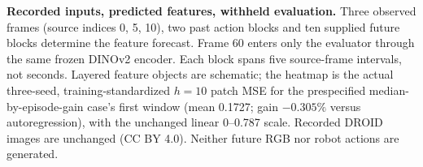 \textbf{Recorded inputs, predicted features, withheld evaluation.} Three observed frames (source indices 0, 5, 10), two past action blocks and ten supplied future blocks determine the feature forecast. Frame 60 enters only the evaluator through the same frozen DINOv2 encoder. Each block spans five source-frame intervals, not seconds. Layered feature objects are schematic; the heatmap is the actual three-seed, training-standardized $h=10$ patch MSE for the prespecified median-by-episode-gain case's first window (mean 0.1727; gain $-0.305\%$ versus autoregression), with the unchanged linear 0--0.787 scale. Recorded DROID images are unchanged (CC BY 4.0). Neither future RGB nor robot actions are generated.
